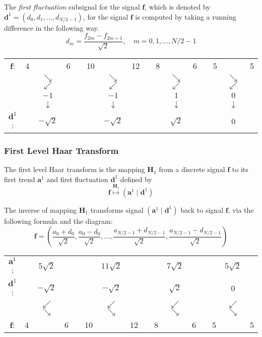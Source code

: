 \documentclass[a4paper,11pt]{article}
\begin{document}
The \emph{first fluctuation} subsignal for the signal $\mathbf{f}$, which is denoted by $\mathbf{d}^{1} = (d_{0},d_{1},\ldots,d_{N/2-1})$, for the signal $\mathbf{f}$ is computed by taking a running difference in the following way.
\begin{equation} \label{dm}
d_{m} = \frac{f_{2m} - f_{2m+1}}{\sqrt{2}}, \quad m=0,1,\ldots,N/2-1
\end{equation}
\begin{center}
\begin{tabular}{cccccccccccccccc}
$\mathbf{f}$: & 4 & & 6 & & 10 & & 12 & & 8 & & 6 & & 5 & & 5 \\
 &   & $\searrow$$\swarrow$ & & & & $\searrow$$\swarrow$ & & & & $\searrow$$\swarrow$ & & & & $\searrow$$\swarrow$ &  \\
 &   & $-1$ & & & & $-1$ & & & & $1$ & & & & $0$ &   \\
 &   & $\downarrow$ & & & & $\downarrow$ & & & & $\downarrow$ & & & & $\downarrow$ &  \\
$\mathbf{d}^{1}$: & & $-\sqrt{2}$ & & & & $-\sqrt{2}$ & & & & $\sqrt{2}$ & & & & $0$ &   
\end{tabular}
\end{center}

\subsubsection*{First Level Haar Transform}
The first level Haar transform is the mapping $\mathbf{H}_{1}$ from a discrete signal $\mathbf{f}$ to its first trend $\mathbf{a}^{1}$ and first fluctuation $\mathbf{d}^{1}$ defined by
\begin{equation} \label{map}
\mathbf{f} \stackrel{\mathbf{H}_{1}}{\longmapsto} \left(\mathbf{a}^{1} \mid \mathbf{d}^{1}\right)
\end{equation}

The inverse of mapping $\mathbf{H}_{1}$ transforms signal $(\mathbf{a}^{1} \mid \mathbf{d}^{1})$ back to signal $\mathbf{f}$, via the following formula and the diagram:
\begin{equation} \label{invmap}
\mathbf{f} = \left(\frac{a_{0}+d_{0}}{\sqrt{2}},\frac{a_{0}-d_{0}}{\sqrt{2}},\ldots,\frac{a_{N/2-1}+d_{N/2-1}}{\sqrt{2}},\frac{a_{N/2-1} - d_{N/2-1}}{\sqrt{2}}\right)
\end{equation}
\begin{center}
\begin{tabular}{cccccccccccccccc}
$\mathbf{a}^{1}$: & & $5\sqrt{2}$ & & & & $11\sqrt{2}$ & & & & $7\sqrt{2}$ & & & & $5\sqrt{2}$ &   \\
$\mathbf{d}^{1}$: & & $-\sqrt{2}$ & & & & $-\sqrt{2}$ & & & & $\sqrt{2}$ & & & & $0$ &   \\
 &   & $\swarrow$$\searrow$ & & & & $\swarrow$$\searrow$ & & & & $\swarrow$$\searrow$ & & & & $\swarrow$$\searrow$ &  \\
$\mathbf{f}$: & 4 & & 6 & & 10 & & 12 & & 8 & & 6 & & 5 & & 5 
\end{tabular}
\end{center}
\end{document}
